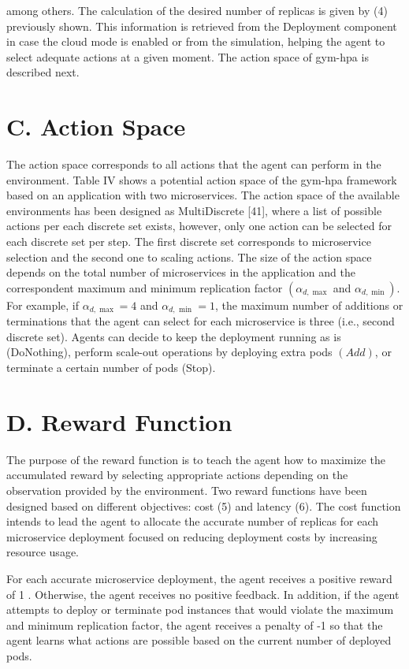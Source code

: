 \documentclass[10pt]{article}
\begin{document}
among others. The calculation of the desired number of replicas is given by (4) previously shown. This information is retrieved from the Deployment component in case the cloud mode is enabled or from the simulation, helping the agent to select adequate actions at a given moment. The action space of gym-hpa is described next.

\section*{C. Action Space}
The action space corresponds to all actions that the agent can perform in the environment. Table IV shows a potential action space of the gym-hpa framework based on an application with two microservices. The action space of the available environments has been designed as MultiDiscrete [41], where a list of possible actions per each discrete set exists, however, only one action can be selected for each discrete set per step. The first discrete set corresponds to microservice selection and the second one to scaling actions. The size of the action space depends on the total number of microservices in the application and the correspondent maximum and minimum replication factor $\left(\alpha_{d, \max }\right.$ and $\left.\alpha_{d, \min }\right)$. For example, if $\alpha_{d, \max }=4$ and $\alpha_{d, \text { min }}=1$, the maximum number of additions or terminations that the agent can select for each microservice is three (i.e., second discrete set). Agents can decide to keep the deployment running as is (DoNothing), perform scale-out operations by deploying extra pods $(A d d)$, or terminate a certain number of pods (Stop).

\section*{D. Reward Function}
The purpose of the reward function is to teach the agent how to maximize the accumulated reward by selecting appropriate actions depending on the observation provided by the environment. Two reward functions have been designed based on different objectives: cost (5) and latency (6). The cost function intends to lead the agent to allocate the accurate number of replicas for each microservice deployment focused on reducing deployment costs by increasing resource usage.

For each accurate microservice deployment, the agent receives a positive reward of 1 . Otherwise, the agent receives no positive feedback. In addition, if the agent attempts to deploy or terminate pod instances that would violate the maximum and minimum replication factor, the agent receives a penalty of -1 so that the agent learns what actions are possible based on the current number of deployed pods.
\end{document}
